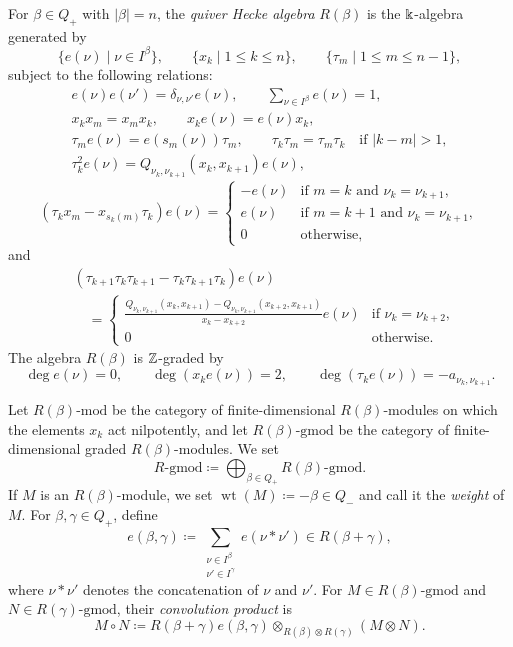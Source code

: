 \begin{Def}
\label{Def : quiver Hecke algebra}
For $\beta \in Q_+$ with $|\beta| = n$,
the \emph{quiver Hecke algebra} $R(\beta)$ is the $\Bbbk$-algebra
generated by
\[
\{e(\nu) \mid \nu \in I^\beta\}, \qquad
\{x_k \mid 1 \leq k \leq n\}, \qquad
\{\tau_m \mid 1 \leq m \leq n - 1\},
\]
subject to the following relations:
\[
\begin{gathered}
e(\nu)e(\nu') = \delta_{\nu, \nu'}e(\nu), \qquad
\sum_{\nu \in I^\beta}e(\nu) = 1, \\
x_k x_m = x_m x_k, \qquad x_k e(\nu) = e(\nu)x_k, \\
\tau_m e(\nu) = e(s_m(\nu))\tau_m, \qquad
\tau_k\tau_m = \tau_m\tau_k \quad \text{if } |k - m| > 1, \\
\tau_k^2 e(\nu) = Q_{\nu_k, \nu_{k + 1}}(x_k, x_{k + 1})e(\nu),
\end{gathered}
\]
\[
(\tau_k x_m - x_{s_k(m)}\tau_k)e(\nu) =
\begin{cases}
-e(\nu) & \text{if } m = k \text{ and } \nu_k = \nu_{k + 1}, \\
e(\nu) & \text{if } m = k + 1 \text{ and } \nu_k = \nu_{k + 1}, \\
0 & \text{otherwise},
\end{cases}
\]
and
\[
\begin{aligned}
&(\tau_{k + 1}\tau_k\tau_{k + 1}
- \tau_k\tau_{k + 1}\tau_k)e(\nu) \\
&\quad =
\begin{cases}
\displaystyle
\frac{Q_{\nu_k, \nu_{k + 1}}(x_k, x_{k + 1})
- Q_{\nu_k, \nu_{k + 1}}(x_{k + 2}, x_{k + 1})}
{x_k - x_{k + 2}}e(\nu)
& \text{if } \nu_k = \nu_{k + 2}, \\
0 & \text{otherwise}.
\end{cases}
\end{aligned}
\]
The algebra $R(\beta)$ is $\mathbb{Z}$-graded by
\[
\deg e(\nu) = 0, \qquad
\deg(x_k e(\nu)) = 2, \qquad
\deg(\tau_k e(\nu)) = -a_{\nu_k, \nu_{k + 1}}.
\]
\end{Def}

Let $R(\beta)\text{-}\mathrm{mod}$ be the category of finite-dimensional
$R(\beta)$-modules on which the elements $x_k$ act nilpotently,
and let $R(\beta)\text{-}\mathrm{gmod}$ be the category
of finite-dimensional graded $R(\beta)$-modules.
We set
\[
R\text{-}\mathrm{gmod} \coloneq
\bigoplus_{\beta \in Q_+}R(\beta)\text{-}\mathrm{gmod}.
\]
If $M$ is an $R(\beta)$-module, we set
$\operatorname{wt}(M) \coloneq -\beta \in Q_-$
and call it the \emph{weight} of $M$.
For $\beta, \gamma \in Q_+$, define
\[
e(\beta, \gamma) \coloneq
\sum_{\substack{\nu \in I^\beta \\ \nu' \in I^\gamma}}
e(\nu * \nu') \in R(\beta + \gamma),
\]
where $\nu * \nu'$ denotes the concatenation of $\nu$ and $\nu'$.
For $M \in R(\beta)\text{-}\mathrm{gmod}$
and $N \in R(\gamma)\text{-}\mathrm{gmod}$,
their \emph{convolution product} is
\[
M \circ N \coloneq R(\beta + \gamma)e(\beta, \gamma)
\otimes_{R(\beta) \otimes R(\gamma)}(M \otimes N).
\]


